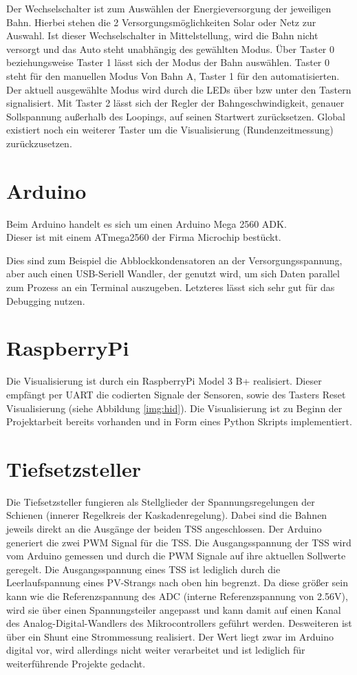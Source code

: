 \documentclass[a4paper, 11pt]{report}
\begin{document}
		Der Wechselschalter ist zum Auswählen der Energieversorgung der jeweiligen Bahn. Hierbei stehen die 2 Versorgungsmöglichkeiten Solar oder Netz zur Auswahl. Ist dieser Wechselschalter in Mittelstellung, wird die Bahn nicht versorgt und das Auto steht unabhängig des gewählten Modus.
		Über Taster 0 beziehungsweise Taster 1 lässt sich der Modus der Bahn auswählen. Taster 0 steht für den manuellen Modus Von Bahn A, Taster 1 für den automatisierten. Der aktuell ausgewählte Modus wird durch die LEDs über bzw unter den Tastern signalisiert.
		Mit Taster 2 lässt sich der Regler der Bahngeschwindigkeit, genauer Sollspannung außerhalb des Loopings, auf seinen Startwert zurücksetzen.
		Global existiert noch ein weiterer Taster um die Visualisierung (Rundenzeitmessung) zurückzusetzen.
	\section{Arduino}
		Beim Arduino handelt es sich um einen Arduino Mega 2560 ADK.\\
		Dieser ist mit einem ATmega2560 der Firma Microchip bestückt.

		Dies sind zum Beispiel die Abblockkondensatoren an der Versorgungsspannung, aber auch einen USB-Seriell Wandler, der genutzt wird, um sich Daten parallel zum Prozess an ein Terminal auszugeben.
		Letzteres lässt sich sehr gut für das Debugging nutzen.

	\section{RaspberryPi}
		Die Visualisierung ist durch ein RaspberryPi Model 3 B+ realisiert. Dieser empfängt per UART die codierten Signale der Sensoren, sowie des Tasters \glqq Reset Visualisierung \grqq (siehe Abbildung \ref{img:hid}).
		Die Visualisierung ist zu Beginn der Projektarbeit bereits vorhanden und in Form eines Python Skripts implementiert.
	\section{Tiefsetzsteller}
		Die Tiefsetzsteller fungieren als Stellglieder der Spannungsregelungen der Schienen (innerer Regelkreis der Kaskadenregelung).
		Dabei sind die Bahnen jeweils direkt an die Ausgänge der beiden TSS angeschlossen.
	  Der Arduino generiert die zwei PWM Signal für die TSS.
		Die Ausgangsspannung der TSS wird vom Arduino gemessen und durch die PWM Signale auf ihre aktuellen Sollwerte geregelt.
		Die Ausgangsspannung eines TSS ist lediglich durch die Leerlaufspannung eines PV-Strangs %
		nach oben hin begrenzt.
		Da diese größer sein kann wie die Referenzspannung des ADC (interne Referenzspannung von 2.56V), wird sie über einen Spannungsteiler angepasst und kann damit auf einen Kanal des Analog-Digital-Wandlers des Mikrocontrollers geführt werden.
		Desweiteren ist über ein Shunt eine Strommessung realisiert.
		Der Wert liegt zwar im Arduino digital vor, wird allerdings nicht weiter
		verarbeitet und ist lediglich für weiterführende Projekte gedacht.
\end{document}
